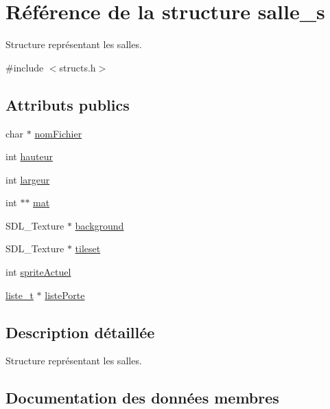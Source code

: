 \hypertarget{structsalle__s}{}\section{Référence de la structure salle\+\_\+s}
\label{structsalle__s}


Structure représentant les salles.  




{\ttfamily \#include $<$structs.\+h$>$}

\subsection*{Attributs publics}
\begin{DoxyCompactItemize}
\item 
char $\ast$ \hyperlink{structsalle__s_a12e47589795f5ed60109cf2b073ec671}{nom\+Fichier}
\item 
int \hyperlink{structsalle__s_a2be13fedfc5f31bc7f02c65af7d95c7a}{hauteur}
\item 
int \hyperlink{structsalle__s_ac1273e8d176620c3b9130d2f1e741315}{largeur}
\item 
int $\ast$$\ast$ \hyperlink{structsalle__s_ad9934630b58b551f8f185dead2006ba6}{mat}
\item 
S\+D\+L\+\_\+\+Texture $\ast$ \hyperlink{structsalle__s_a5ef73bdeb5f07b6c8b4978dcf265d0d2}{background}
\item 
S\+D\+L\+\_\+\+Texture $\ast$ \hyperlink{structsalle__s_a44a7c08d109019af0e4877e488cef708}{tileset}
\item 
int \hyperlink{structsalle__s_a0305fc652ff8d07decc455bfc34ea595}{sprite\+Actuel}
\item 
\hyperlink{structliste__s}{liste\+\_\+t} $\ast$ \hyperlink{structsalle__s_a8c3b513a26b2418863a37bfd91f86b11}{liste\+Porte}
\end{DoxyCompactItemize}


\subsection{Description détaillée}
Structure représentant les salles. 

\subsection{Documentation des données membres}
\mbox{\label{structsalle__s_a5ef73bdeb5f07b6c8b4978dcf265d0d2}} 
